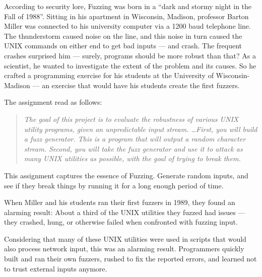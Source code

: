 According to security lore, Fuzzing was born in a ``dark and stormy night in the
Fall of 1988''. Sitting in his apartment in Wisconsin, Madison, professor Barton
Miller was connected to his university computer via a 1200 baud telephone line.
The thunderstorm caused noise on the line, and this noise in turn caused the
UNIX commands on either end to get bad inputs --- and crash. The frequent crashes
surprised him --- surely, programs should be more robust than that? As a
scientist, he wanted to investigate the extent of the problem and its causes. So
he crafted a programming exercise for his students at the University of
Wisconsin-Madison --- an exercise that would have his students create the first
fuzzers.

The assignment read as follows:

\begin{quote}
    {\it The goal of this project is to evaluate the robustness of various UNIX
    utility programs, given an unpredictable input stream. \dots First, you will
    build a fuzz generator. This is a program that will output a random character
    stream. Second, you will take the fuzz generator and use it to attack as many
    UNIX utilities as possible, with the goal of trying to break them.}
\end{quote}

This assignment captures the essence of Fuzzing. Generate random inputs, and see
if they break things by running it for a long enough period of time.

When Miller and his students ran their first fuzzers in 1989, they found an
alarming result: About a third of the UNIX utilities they fuzzed had issues ---
they crashed, hung, or otherwise failed when confronted with fuzzing input.

Considering that many of these UNIX utilities were used in scripts that would
also process network input, this was an alarming result. Programmers quickly
built and ran their own fuzzers, rushed to fix the reported errors, and learned
not to trust external inputs anymore.
%






